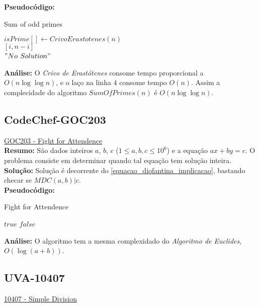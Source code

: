 \textbf{Pseudocódigo:}
\begin{algorithm}
\caption{Sum of odd primes}
\begin{algorithmic}[1]
\State $isPrime[] \gets CrivoErastotenes(n)$
\\
\State \Return $[i, n-i]$
\EndIf
\EndFor
\\
\State \Return $"No$ $Solution"$
\EndProcedure
\end{algorithmic}
\end{algorithm}

\textbf{Análise:}
O \textit{Crivo de Erastótenes} consome tempo proporcional a $O(n \log \log n)$, e o laço na linha $4$ consome tempo $O(n)$. Assim a complecidade do algoritmo $SumOfPrimes(n)$ é $O(n \log \log n)$.

\subsection{CodeChef-GOC203}
\href{https://www.codechef.com/problems/GOC203}{GOC203 - Fight for Attendence}\\

\textbf{Resumo:}
São dados inteiros $a$, $b$, $c$ ($1 \leq a, b, c \leq 10^6$) e a equação $ax+by=c$. O problema consiste em determinar 
quando tal equação tem solução inteira.
\\

\textbf{Solução:}
Solução é decorrente do \autoref{equacao_diofantina_implicacao}, bastando checar se $MDC(a,b)|c$.
\\

\textbf{Pseudocódigo:}
\begin{algorithm}
\caption{Fight for Attendence}
\begin{algorithmic}[1]
\State \Return $true$
\EndIf
\State \Return $false$
\EndProcedure
\end{algorithmic}
\end{algorithm}

\textbf{Análise:}
O algoritmo tem a mesma complexidado do \textit{Algoritmo de Euclides}, $O(\log{(a+b)})$. 



\subsection{UVA-10407}
\href{https://uva.onlinejudge.org/index.php?option=onlinejudge&page=show_problem&problem=1348}{10407 - Simple Division} \\

